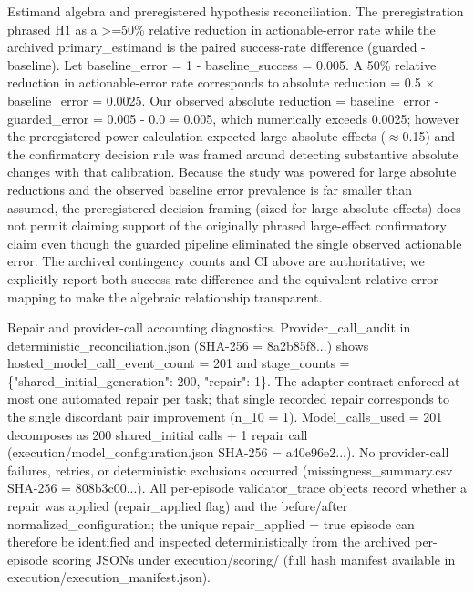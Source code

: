 \documentclass[conference]{IEEEtran}
\begin{document}
Estimand algebra and preregistered hypothesis reconciliation. The preregistration phrased H1 as a >=50\% relative reduction in actionable-error rate while the archived primary\_estimand is the paired success-rate difference (guarded - baseline). Let baseline\_error = 1 - baseline\_success = 0.005. A 50\% relative reduction in actionable-error rate corresponds to absolute reduction = 0.5 \ensuremath{\times} baseline\_error = 0.0025. Our observed absolute reduction = baseline\_error - guarded\_error = 0.005 - 0.0 = 0.005, which numerically exceeds 0.0025; however the preregistered power calculation expected large absolute effects (\ensuremath{\approx}0.15) and the confirmatory decision rule was framed around detecting substantive absolute changes with that calibration. Because the study was powered for large absolute reductions and the observed baseline error prevalence is far smaller than assumed, the preregistered decision framing (sized for large absolute effects) does not permit claiming support of the originally phrased large-effect confirmatory claim even though the guarded pipeline eliminated the single observed actionable error. The archived contingency counts and CI above are authoritative; we explicitly report both success-rate difference and the equivalent relative-error mapping to make the algebraic relationship transparent.

Repair and provider-call accounting diagnostics. Provider\_call\_audit in deterministic\_reconciliation.json (SHA-256 = 8a2b85f8...) shows hosted\_model\_call\_event\_count = 201 and stage\_counts = \{"shared\_initial\_generation": 200, "repair": 1\}. The adapter contract enforced at most one automated repair per task; that single recorded repair corresponds to the single discordant pair improvement (n\_10 = 1). Model\_calls\_used = 201 decomposes as 200 shared\_initial calls + 1 repair call (execution/model\_configuration.json SHA-256 = a40e96e2...). No provider-call failures, retries, or deterministic exclusions occurred (missingness\_summary.csv SHA-256 = 808b3c00...). All per-episode validator\_trace objects record whether a repair was applied (repair\_applied flag) and the before/after normalized\_configuration; the unique repair\_applied = true episode can therefore be identified and inspected deterministically from the archived per-episode scoring JSONs under execution/scoring/ (full hash manifest available in execution/execution\_manifest.json).
\end{document}
